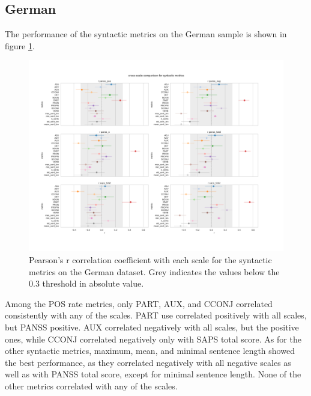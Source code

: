 \subsection{German}
The performance of the syntactic metrics on the German sample is shown in figure \ref{fig:results:syntactic:de}. 

\begin{figure}[h!]
    \includegraphics[width=1.2\textwidth, center]{Figures/chapter_4/syntactic/de_scale_r.png} 
\captionsetup{width=\textwidth}
\caption[Syntactic Metrics: German]{\label{fig:results:syntactic:de} Pearson's r correlation coefficient with each scale for the syntactic metrics on the German dataset. Grey indicates the values below the 0.3 threshold in absolute value.}
\end{figure}

Among the POS rate metrics, only PART, AUX, and CCONJ correlated consistently with any of the scales. PART use correlated positively with all scales, but PANSS positive. AUX correlated negatively with all scales, but the positive ones, while CCONJ correlated negatively only with SAPS total score. As for the other syntactic metrics, maximum, mean, and minimal sentence length showed the best performance, as they correlated negatively with all negative scales as well as with PANSS total score, except for minimal sentence length. None of the other metrics correlated with any of the scales.


